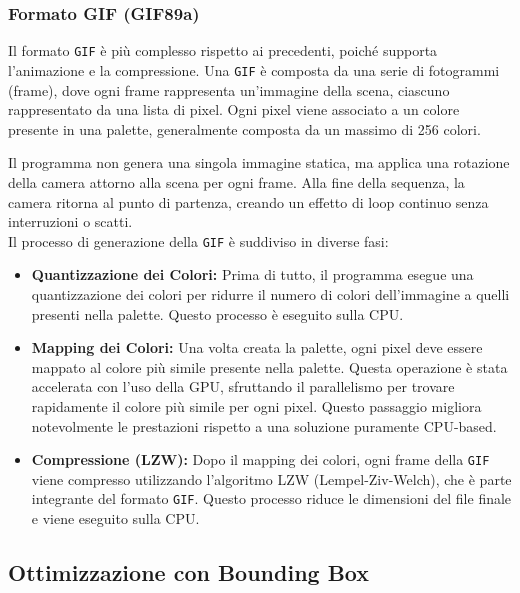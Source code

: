 \documentclass{article}
\begin{document}
\subsubsection{Formato GIF (GIF89a)}

Il formato \texttt{GIF} è più complesso rispetto ai precedenti, poiché supporta l'animazione e la compressione. Una \texttt{GIF} è composta da una serie di fotogrammi (frame), dove ogni frame rappresenta un’immagine della scena, ciascuno rappresentato da una lista di pixel. Ogni pixel viene associato a un colore presente in una palette, generalmente composta da un massimo di 256 colori.

Il programma non genera una singola immagine statica, ma applica una rotazione della camera attorno alla scena per ogni frame. Alla fine della sequenza, la camera ritorna al punto di partenza, creando un effetto di loop continuo senza interruzioni o scatti.\\

Il processo di generazione della \texttt{GIF} è suddiviso in diverse fasi:
\begin{itemize}
    \item \textbf{Quantizzazione dei Colori:} Prima di tutto, il programma esegue una quantizzazione dei colori per ridurre il numero di colori dell'immagine a quelli presenti nella palette. Questo processo è eseguito sulla CPU.

    \item \textbf{Mapping dei Colori:} Una volta creata la palette, ogni pixel deve essere mappato al colore più simile presente nella palette. Questa operazione è stata accelerata con l'uso della GPU, sfruttando il parallelismo per trovare rapidamente il colore più simile per ogni pixel. Questo passaggio migliora notevolmente le prestazioni rispetto a una soluzione puramente CPU-based.

    \item \textbf{Compressione (LZW):} Dopo il mapping dei colori, ogni frame della \texttt{GIF} viene compresso utilizzando l'algoritmo LZW (Lempel-Ziv-Welch)\cite{LZW}, che è parte integrante del formato \texttt{GIF}. Questo processo riduce le dimensioni del file finale e viene eseguito sulla CPU.
\end{itemize}

\subsection{Ottimizzazione con Bounding Box}
\end{document}
